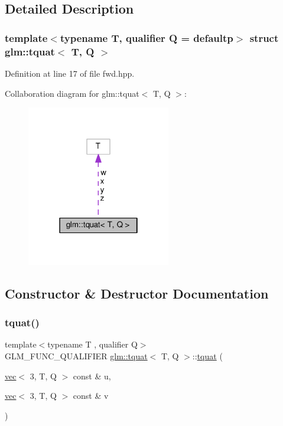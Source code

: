 \subsection{Detailed Description}
\subsubsection*{template$<$typename T, qualifier Q = defaultp$>$\newline
struct glm\+::tquat$<$ T, Q $>$}



Definition at line 17 of file fwd.\+hpp.



Collaboration diagram for glm\+:\+:tquat$<$ T, Q $>$\+:
\nopagebreak
\begin{figure}[H]
\begin{center}
\leavevmode
\includegraphics[width=178pt]{d3/d03/structglm_1_1tquat__coll__graph}
\end{center}
\end{figure}


\subsection{Constructor \& Destructor Documentation}
\mbox{\label{structglm_1_1tquat_ad0b0aeae222fe05fb5d26fd40d74b9b6}} 
\subsubsection{\texorpdfstring{tquat()}{tquat()}}
{\footnotesize\ttfamily template$<$typename T , qualifier Q$>$ \\
G\+L\+M\+\_\+\+F\+U\+N\+C\+\_\+\+Q\+U\+A\+L\+I\+F\+I\+ER \hyperlink{structglm_1_1tquat}{glm\+::tquat}$<$ T, Q $>$\+::\hyperlink{structglm_1_1tquat}{tquat} (\begin{DoxyParamCaption}\item[{\hyperlink{structglm_1_1vec}{vec}$<$ 3, T, Q $>$ const \&}]{u,  }\item[{\hyperlink{structglm_1_1vec}{vec}$<$ 3, T, Q $>$ const \&}]{v }\end{DoxyParamCaption})}



